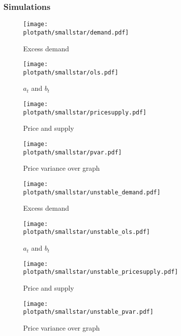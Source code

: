 \subsubsection{Simulations}

\begin{figure}[!h]
    \label{fig:smallstar}
    \begin{minipage}[b]{0.5\linewidth}
        \centering
        \texttt{[image: \\plotpath/smallstar/demand.pdf]}
        \caption{Excess demand}
    \end{minipage}%
    \begin{minipage}[b]{0.5\linewidth}
        \centering
        \texttt{[image: \\plotpath/smallstar/ols.pdf]}
        \caption{$a_t$ and $b_t$}
    \end{minipage}
    \begin{minipage}[b]{0.5\linewidth}
        \centering
        \texttt{[image: \\plotpath/smallstar/pricesupply.pdf]}
        \caption{Price and supply}
    \end{minipage}%
    \begin{minipage}[b]{0.5\linewidth}
        \centering
        \texttt{[image: \\plotpath/smallstar/pvar.pdf]}
        \caption{Price variance over graph}
    \end{minipage}
\end{figure}

\begin{figure}[!h]
    \label{fig:smallstar_unstable}
    \begin{minipage}[b]{0.5\linewidth}
        \centering
        \texttt{[image: \\plotpath/smallstar/unstable\_demand.pdf]}
        \caption{Excess demand}
    \end{minipage}%
    \begin{minipage}[b]{0.5\linewidth}
        \centering
        \texttt{[image: \\plotpath/smallstar/unstable\_ols.pdf]}
        \caption{$a_t$ and $b_t$}
    \end{minipage}
    \begin{minipage}[b]{0.5\linewidth}
        \centering
        \texttt{[image: \\plotpath/smallstar/unstable\_pricesupply.pdf]}
        \caption{Price and supply}
    \end{minipage}%
    \begin{minipage}[b]{0.5\linewidth}
        \centering
        \texttt{[image: \\plotpath/smallstar/unstable\_pvar.pdf]}
        \caption{Price variance over graph}
    \end{minipage}
\end{figure}